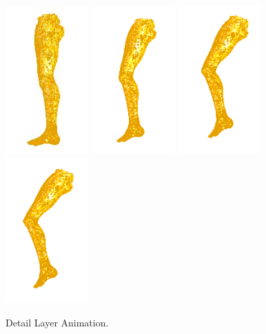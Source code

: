 \documentclass[10pt,oneside,fleqn,a4paper]{book}
\begin{document}
\begin{figure}
\begin{center}
\includegraphics[width=3.18cm]{../images/dense_leg_1}
\includegraphics[width=3.18cm]{../images/dense_leg_2}
\includegraphics[width=3.18cm]{../images/dense_leg_3}
\includegraphics[width=3.18cm]{../images/dense_leg_4}
\caption[Detail Layer Animation]{\label{fig:detaillayer} Detail Layer Animation.}
\end{center}
\end{figure}
\end{document}
